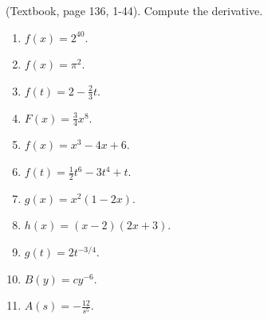 (Textbook, page 136, 1-44).
Compute the derivative.
\begin{multicols}{2}
\begin{enumerate}
\item $f(x)=2^{40}$.

\item $f(x)=\pi^2$.

\item $f(t)=2-\frac{2}{3}t$.

\item $F(x)=\frac{3}{4}x^8$.

\item $f(x)=x^3-4x+6$.

\item $f(t)=\frac{1}{2}t^6-3t^4+t$.

\item $g(x)=x^2(1-2x)$. 

\item $h(x)=(x-2)(2x+3)$.

\item $g(t)=2t^{-3/4}$.

\item $B(y)=c y^{-6}$.

\item $A(s)=-\frac{12}{s^5}$.

\end{enumerate}
\end{multicols}
